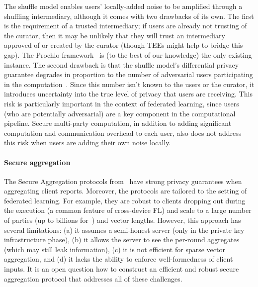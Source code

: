 \documentclass[11pt]{article}
\begin{document}
The shuffle model enables users' locally-added noise to be amplified through a shuffling intermediary, although it comes with two drawbacks of its own.
The first is the requirement of a trusted intermediary; if users are already not trusting of the curator, then it may be unlikely that they will trust an intermediary approved of or created by the curator (though TEEs might help to bridge this gap).  The Prochlo framework~\cite{prochlo} is (to the best of our knowledge) the only existing instance.
The second drawback is that the shuffle model's differential privacy guarantee degrades in proportion to the number of adversarial users participating in the computation~\cite{BalleBGN19}.
Since this number isn't known to the users or the curator, it introduces uncertainty into the true level of privacy that users are receiving.
This risk is particularly important in the context of federated learning, since users (who are potentially adversarial) are a key component in the computational pipeline.
Secure multi-party computation, in addition to adding significant computation and communication overhead to each user, also does not address this risk when users are adding their own noise locally.


\paragraph{Secure aggregation} 

The Secure Aggregation protocols from~\cite{bonawitz17secagg, bell20secagg} have strong privacy guarantees when aggregating client reports. Moreover, the protocols are tailored to the setting of federated learning. For example, they are robust to clients dropping out during the execution (a common feature of cross-device FL) and scale to a large number of parties (up to billions for~\citet{bell20secagg}) and vector lengths. However, this approach has several limitations: (a) it assumes a semi-honest server (only in the private key infrastructure phase), (b) it allows the server to see the per-round aggregates (which may still leak information), (c) it is not efficient for sparse vector aggregation, and (d) it lacks the ability to enforce well-formedness of client inputs.  It is an open question how to construct an efficient and robust secure aggregation protocol that addresses all of these challenges.


\end{document}
